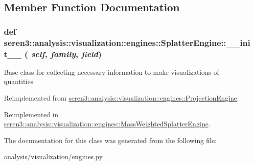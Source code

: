 \subsection{Member Function Documentation}
\hypertarget{classseren3_1_1analysis_1_1visualization_1_1engines_1_1SplatterEngine_acb5713fdebb0354f14b8d3e1d00fc05b}{
\subsubsection[{\_\-\_\-init\_\-\_\-}]{\setlength{\rightskip}{0pt plus 5cm}def seren3::analysis::visualization::engines::SplatterEngine::\_\-\_\-init\_\-\_\- ( {\em self}, \/   {\em family}, \/   {\em field})}}
\label{classseren3_1_1analysis_1_1visualization_1_1engines_1_1SplatterEngine_acb5713fdebb0354f14b8d3e1d00fc05b}
\begin{DoxyVerb}
    Base class for collecting necessary information to make visualizations of quantities
\end{DoxyVerb}
 

Reimplemented from \hyperlink{classseren3_1_1analysis_1_1visualization_1_1engines_1_1ProjectionEngine_ab9066571de775d34e0a244225a4351fb}{seren3::analysis::visualization::engines::ProjectionEngine}.

Reimplemented in \hyperlink{classseren3_1_1analysis_1_1visualization_1_1engines_1_1MassWeightedSplatterEngine_ac4d8bdd7049a6d50e5316fbb7777ad0a}{seren3::analysis::visualization::engines::MassWeightedSplatterEngine}.

The documentation for this class was generated from the following file:\begin{DoxyCompactItemize}
\item 
analysis/visualization/engines.py\end{DoxyCompactItemize}
